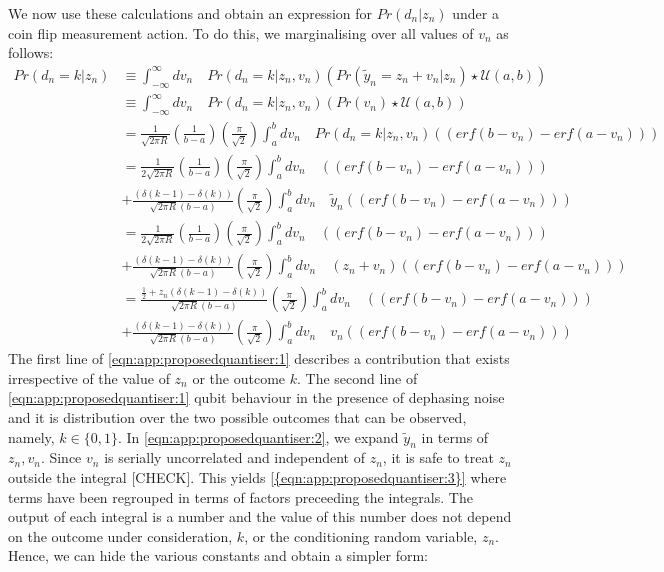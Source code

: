 We now use these calculations and obtain an expression for $Pr(d_n | z_n)$ under a coin flip measurement action. To do this, we marginalising over all values of $v_n$ as follows:
\begin{align}
Pr(d_n=k | z_n) & \equiv  \int_{-\infty}^{\infty} dv_n \quad  Pr(d_n=k | z_n, v_n) \left( Pr( \tilde{y}_n = z_n + v_n| z_n) \star \mathcal{U}(a,b) \right)  \\
 & \equiv  \int_{-\infty}^{\infty} dv_n \quad  Pr(d_n=k | z_n, v_n) \left( Pr( v_n) \star \mathcal{U}(a,b) \right)  \\
&=  \frac{1}{\sqrt{2\pi R}} \left( \frac{1}{b-a} \right) \left( \frac{\pi}{\sqrt{2}} \right) \int_{a}^{b} dv_n \quad  Pr(d_n=k | z_n, v_n) \left( \left( erf(b - v_n) - erf(a - v_n)\right)  \right) \\
&=  \frac{1}{2\sqrt{2\pi R}} \left( \frac{1}{b-a} \right) \left( \frac{\pi}{\sqrt{2}} \right) \int_{a}^{b} dv_n \quad  \left( \left( erf(b - v_n) - erf(a - v_n)\right)  \right) \nonumber \\
&+  \frac{\left( \delta(k-1) - \delta(k) \right)}{\sqrt{2\pi R}(b-a)}  \left( \frac{\pi}{\sqrt{2}} \right) \int_{a}^{b} dv_n \quad  \tilde{y}_n \left( \left( erf(b - v_n) - erf(a - v_n)\right)  \right) \label{eqn:app:proposedquantiser:1}\\
&=  \frac{1}{2\sqrt{2\pi R}} \left( \frac{1}{b-a} \right) \left( \frac{\pi}{\sqrt{2}} \right) \int_{a}^{b} dv_n \quad  \left( \left( erf(b - v_n) - erf(a - v_n)\right)  \right) \nonumber \\
&+  \frac{\left( \delta(k-1) - \delta(k) \right)}{\sqrt{2\pi R}(b-a)}  \left( \frac{\pi}{\sqrt{2}} \right) \int_{a}^{b} dv_n \quad  (z_n + v_n) \left( \left( erf(b - v_n) - erf(a - v_n)\right)  \right) \label{eqn:app:proposedquantiser:2}\\
&=  \frac{\frac{1}{2}+ z_n \left( \delta(k-1) - \delta(k) \right)}{\sqrt{2\pi R}(b-a)}  \left( \frac{\pi}{\sqrt{2}} \right) \int_{a}^{b} dv_n \quad  \left( \left( erf(b - v_n) - erf(a - v_n)\right)  \right) \nonumber \\
&+  \frac{\left( \delta(k-1) - \delta(k) \right)}{\sqrt{2\pi R}(b-a)}  \left( \frac{\pi}{\sqrt{2}} \right) \int_{a}^{b} dv_n \quad  v_n \left( \left( erf(b - v_n) - erf(a - v_n)\right)  \right) \label{eqn:app:proposedquantiser:3}
\end{align}
The first line of \cref{eqn:app:proposedquantiser:1} describes a contribution that exists irrespective of the value of $z_n$ or the outcome $k$. The second line of \cref{eqn:app:proposedquantiser:1} qubit behaviour in the presence of dephasing noise and it is distribution over the two possible outcomes that can be observed, namely, $k \in \{ 0, 1\}$. In \cref{eqn:app:proposedquantiser:2}, we expand $\tilde{y}_n$ in terms of $z_n, v_n$. Since $v_n$ is serially uncorrelated and independent of $z_n$, it is safe to treat $z_n$ outside the integral [CHECK]. This yields \cref{{eqn:app:proposedquantiser:3}} where terms have been regrouped in terms of factors preceeding the integrals. The output of each integral is a number and the value of this number does not depend on the outcome under consideration, $k$, or the conditioning random variable, $z_n$. Hence, we can hide the various constants and obtain a simpler form:

